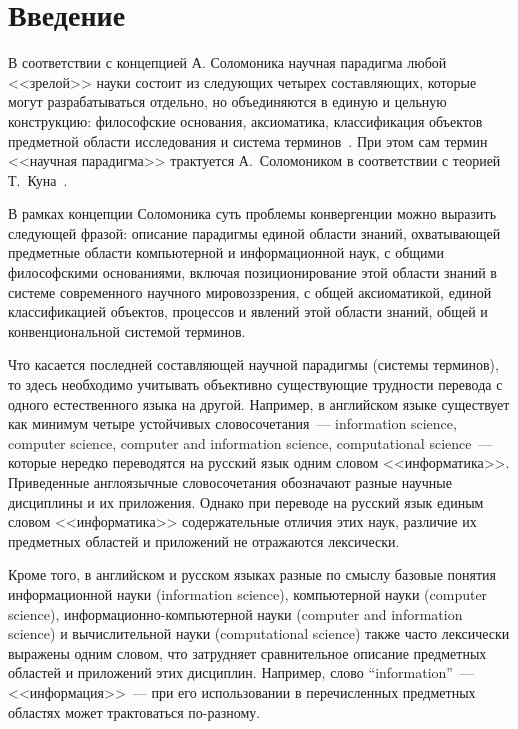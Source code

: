       \begin{multicols}{2}


      \label{st\stat}

\section{Введение}

      В соответствии с концепцией А. Соломоника научная парадигма любой <<зрелой>>
науки состоит из следующих четырех составляющих, которые могут разрабатываться отдельно,
но объединяются в единую и цельную конструкцию: философские основания, аксиоматика,
классификация объектов предметной области исследования и система терминов~\cite{3za}.
При этом сам термин <<научная парадигма>> трактуется А.~Соломоником в соответствии с
теорией Т.~Куна~\cite{4za}.

      В рамках концепции Соломоника суть проблемы конвергенции можно выразить
следующей фразой: описание парадигмы единой области знаний, охватывающей предметные
области компьютерной и информационной наук, с общими философскими основаниями,
включая позиционирование этой области знаний в системе современного научного
мировоззрения, с общей аксиоматикой, единой классификацией объектов, процессов и явлений
этой области знаний, общей и конвенциональной системой терминов.

      Что касается последней составляющей научной парадигмы (системы терминов), то здесь
необходимо учитывать объективно существующие трудности перевода с одного естественного
языка на другой. Например, в английском языке существует как минимум четыре устойчивых
словосочетания~--- information science, computer science, computer and information science,
computational science~--- которые нередко переводятся на русский язык одним словом
<<информатика>>. Приведенные англоязычные словосочетания обозначают разные научные
дисциплины и их приложения. Однако при переводе на русский язык единым словом
<<информатика>> содержательные отличия этих наук, различие их предметных областей и
приложений не отражаются лексически.

      Кроме того, в английском и русском языках разные по смыслу базовые понятия
информационной науки (information science), компьютерной науки (computer science),
информационно-компью\-тер\-ной науки (computer and information science) и вычислительной
науки (computational science) также часто лексически выражены одним словом, что затрудняет
сравнительное описание предметных областей и приложений этих дисциплин. Например, слово
``information''~--- <<информация>>~--- при его использовании в перечисленных предметных областях
может трактоваться по-разному. 


\end{multicols}
